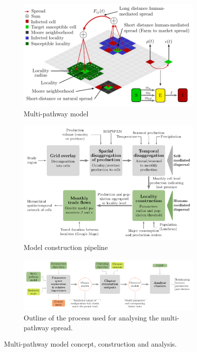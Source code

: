 \documentclass[11pt]{article}
\theoremstyle{definition}
\begin{document}
\begin{figure}[t]
\centering
\begin{subfigure}[b]{.4\textwidth}
    \includegraphics[width=1.1\textwidth]{model_schematic.pdf}
\caption{Multi-pathway model\label{fig:concept}}
\end{subfigure}
\begin{subfigure}[b]{.56\textwidth}
    \includegraphics[width=1.05\textwidth]{pipeline.pdf}
\caption{Model construction pipeline\label{fig:pipeline}}
\end{subfigure}
\begin{subfigure}[b]{.8\textwidth}
    \centering
    \includegraphics[width=\textwidth]{spread_analysis.pdf}
    \caption{Outline of the process used for analysing the multi-pathway spread. \label{fig:clusterOutline}}
\end{subfigure}
\caption{Multi-pathway model concept, construction and analysis.}
\end{figure}
\end{document}

